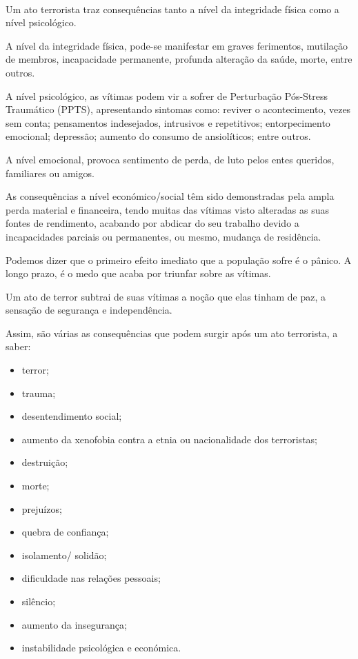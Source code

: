 \documentclass{report}
\begin{document}
\paragraph{} Um ato terrorista traz consequências tanto a nível da integridade física como a nível psicológico.\par
A nível da integridade física, pode-se manifestar em graves ferimentos, mutilação de membros, incapacidade permanente, profunda alteração da saúde,  morte, entre outros.\par
A nível psicológico, as vítimas podem vir a sofrer de Perturbação Pós-Stress Traumático (PPTS), apresentando sintomas como: reviver o acontecimento, vezes sem conta; pensamentos indesejados, intrusivos e repetitivos; entorpecimento emocional; depressão; aumento do consumo de ansiolíticos; entre outros.\par
A nível emocional, provoca sentimento de perda, de luto pelos entes queridos, familiares ou amigos.\par
As consequências a nível económico/social têm sido demonstradas pela ampla perda material e financeira, tendo muitas das vítimas visto alteradas as suas fontes de rendimento, acabando por abdicar do seu trabalho devido a incapacidades parciais ou permanentes, ou mesmo, mudança de residência.\par
Podemos dizer que o primeiro efeito imediato que a população sofre é o pânico. A longo prazo, é o medo que acaba por triunfar sobre as vítimas. \par
Um ato de terror subtrai de suas vítimas a noção que elas tinham de paz, a sensação de segurança e independência.\par
Assim, são várias as consequências que podem surgir após um ato terrorista, a saber:
\begin{itemize}
 \item terror;
 \item trauma;
 \item desentendimento social;
 \item aumento da xenofobia contra a etnia ou nacionalidade dos terroristas;
 \item destruição;
 \item morte;
 \item prejuízos;
 \item quebra de confiança;
 \item isolamento/ solidão;
 \item dificuldade nas relações pessoais;
 \item silêncio;
 \item aumento da insegurança;
 \item instabilidade psicológica e económica.
\end{itemize}
\end{document}
